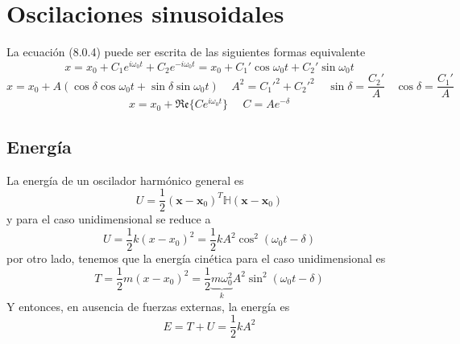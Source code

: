\section{Oscilaciones sinusoidales}
La ecuación (8.0.4) puede ser escrita de las siguientes formas equivalente
\begin{equation} \label{6.1.1}
    x = x_0 + C_1e^{i\omega_0t}+ C_2e^{-i\omega_0t} = x_0 + C_1'\cos\omega_0 t + C_2'\sin \omega_0 t
\end{equation}
\vspace{-25pt}
\begin{equation} \label{6.1.1}
    x = x_0 + A\left(\cos\delta\cos\omega_0 t + \sin\delta\sin \omega_0 t\right) \ \ \ \ \ A^2 = C_1'^2+C_2'^2 \ \ \ \ \ \sin\delta = \frac{C_2'}{A} \ \ \ \ \cos\delta = \frac{C_1'}{A}
\end{equation}
\vspace{-15pt}
\begin{equation} \label{6.1.1}
    x =  x_0 + \mathfrak{Re}\{C e^{i\omega_0t}\} \ \ \ \ \ \ C = A e^{-\delta}
\end{equation}
\newpage
\subsection{Energía}
La energía de un oscilador harmónico general es 
\begin{equation} \label{6.1.1}
    U = \frac{1}{2}(\mathbf{x}-\mathbf{x}_0)^T \mathbb{H} (\mathbf{x}-\mathbf{x}_0)
\end{equation}
y para el caso unidimensional se reduce a 
\begin{equation} \label{6.1.1}
    U = \frac{1}{2}k(x-x_0)^2 = \frac{1}{2}kA^2 \cos^2(\omega_0t-\delta)
\end{equation}
por otro lado, tenemos que la energía cinética para el caso unidimensional es 
\begin{equation} \label{6.1.1}
    T = \frac{1}{2}m(x-x_0)^2 = \frac{1}{2}\underbrace{m\omega_0^2}_k A^2 \sin^2(\omega_0t-\delta)
\end{equation}
Y entonces, en ausencia de fuerzas externas, la energía es
\begin{equation} \label{6.1.1}
    E = T+U = \frac{1}{2} k A^2
\end{equation}
\vspace{-25pt}
